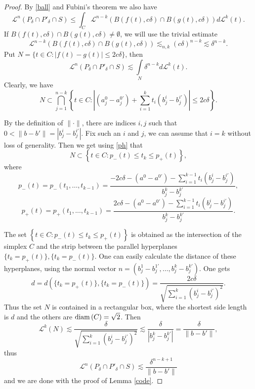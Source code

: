 \documentclass[a4paper]{amsart}
\theoremstyle{definition} \newtheorem{remark}[theorem]{Remark}
\def\su{\subset}
\def\de{\delta}
\def\diam{{\rm diam}\, }
\def\leb{\mathcal{L}}
\def\lkb{\lesssim}
\begin{document}
\begin{proof}
By \eqref{ball} and Fubini's theorem we also have 
$$\leb^n(P_{\de} \cap P'_{\de} \cap S) \leq \int_C \leb^{n-k}(B(f(t),c\de) \cap B(g(t),c\de)) d\leb^k(t).$$
If $B(f(t),c\de) \cap B(g(t),c\de) \neq \emptyset$, we will use the trivial estimate 
$$\leb^{n-k}(B(f(t),c\de) \cap B(g(t),c\de)) \lkb_{n,k} (c\de)^{n-k} \lkb \de^{n-k}.$$ 
Put $N=\{t \in C \colon |f(t)-g(t)| \leq 2 c \de \}$, then 
$$\leb^n(P_{\de} \cap P'_{\de} \cap S) \lkb \int\limits_{N} \de^{n-k} d\leb^k(t).$$ 
%
Clearly, we have
\begin{equation}
\label{ph}
N \su \bigcap_{j=1}^{n-k} \left\{t \in C \colon 
\left|\left(a_j^0-a_j^{0'} \right) + \sum_{i=1}^k t_i \left(b_j^i-b_j^{i'} \right) \right| \leq 2c\de \right\}.
\end{equation}

By the definition of $\| \cdot \|$, there are indices $i,j$ such that $0 <\|b-b'\| =|b_j^i-b_j^{i'}|$. 
Fix such an $i$ and $j$, we can assume that $i=k$ without loss of generality. 
Then we get using \eqref{ph} that 
$$N \su \left\{t \in C \colon p_-(t) \leq t_k \leq p_+(t) \right\},$$
where 
$$p_-(t)=p_-(t_1,\dots,t_{k-1})=\frac{-2c\de-(a^0-a^{0'})-\sum\limits_{i=1}^{k-1} t_i (b_j^i-b_j^{i'})}{b_j^k-b_j^{k'}},$$ 
$$p_+(t)=p_+(t_1,\dots,t_{k-1})=\frac{2c\de-(a^0-a^{0'})-\sum\limits_{i=1}^{k-1} t_i (b_j^i-b_j^{i'})}{b_j^k-b_j^{k'}}.$$ 

The set $\left\{t \in C \colon p_-(t) \leq t_k \leq p_+(t) \right\}$ is obtained as the intersection of the simplex $C$ and 
the strip between the parallel hyperplanes $\{t_k=p_+(t)\}, \{t_k=p_-(t)\}$. 
One can easily calculate the distance of these hyperplanes, using the normal vector $n=(b_j^1-b_j^{1'},\dots,b_j^k-b_j^{k'})$. 
One gets  
$$d=d(\{t_k=p_+(t)\}, \{t_k=p_-(t)\})=\frac{2c\de}{\sqrt{\sum\limits_{i=1}^{k} (b_j^i-b_j^{i'})^2}}.$$
Thus the set $N$ is contained in a rectangular box, where the shortest side length is $d$ and the others are $\diam(C)=\sqrt{2}$. Then
$$\leb^k(N) \lkb \frac{\de}{\sqrt{\sum\limits_{i=1}^{k} (b_j^i-b_j^{i'})^2}} \lkb 
\frac{\de}{|b_j^k-b_j^{k'}|} = \frac{\de}{\|b-b'\|},$$
thus 
$$\leb^n(P_{\de} \cap P'_{\de} \cap S) \lkb \frac{\de^{n-k+1}}{\|b-b'\|}$$ 
 and we are done with the proof of Lemma \ref{code}. 
\end{proof}
\end{document}
